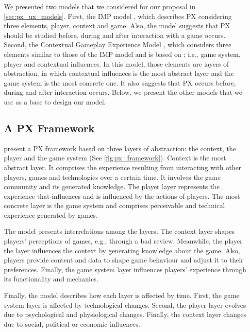 We presented two models that we considered for our proposal in \autoref{sec:px_ux_models}. First, the \ac{IMP} model \autocite{Elson2014}, which describes \ac{PX} considering three elements, player, context and game. Also, the model suggests that \ac{PX} should be studied before, during and after interaction with a game occurs. Second, the Contextual Gameplay Experience Model \autocite{Engl2013}, which considers three elements similar to those of the \ac{IMP} model and is based on \autocite{Nackea2,Nacked}; i.e., game system, player and contextual influences. In this model, those elements are layers of abstraction, in which contextual influences is the most abstract layer and the game system is the most concrete one. It also suggests that \ac{PX} occurs before, during and after interaction occurs. Below, we present the other models that we use as a base to design our model.

\subsection{A PX Framework}
\textcite{Nackea2} present a \ac{PX} framework based on three layers of abstraction: the context, the player and the game system (See \autoref{fig:px_framework}). Context is the most abstract layer. It comprises the experience resulting from interacting with other players, games and technologies over a certain time. It involves the game community and its generated knowledge. The player layer represents the experience that influences and is influenced by the actions of players. The most concrete layer is the game system and comprises perceivable and technical experience generated by games.

The model presents interrelations among the layers. The context layer shapes players' perceptions of games, e.g., through a bad review. Meanwhile, the player the layer influences the context by generating knowledge about the game. Also, players provide content and data to shape game behaviour and adjust it to their preferences. Finally, the game system layer influences players' experience through its functionality and mechanics.

Finally, the model describes how each layer is affected by time. First, the game system layer is affected by technological changes. Second, the player layer evolves due to psychological and physiological changes. Finally, the context layer changes due to social, political or economic influences.

